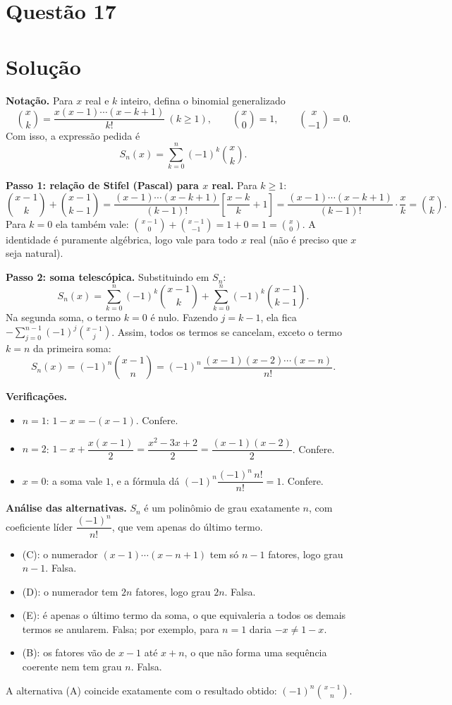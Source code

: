 \documentclass{article}%
\begin{document}
\section*{Questão 17}

\section*{Solução}

\textbf{Notação.} Para $x$ real e $k$ inteiro, defina o binomial generalizado
\[
\binom{x}{k}=\frac{x(x-1)\cdots(x-k+1)}{k!}\ (k\ge 1),\qquad \binom{x}{0}=1,\qquad \binom{x}{-1}=0 .
\]
Com isso, a expressão pedida é
\[
S_n(x)=\sum_{k=0}^{n}(-1)^k\binom{x}{k}.
\]

\textbf{Passo 1: relação de Stifel (Pascal) para $x$ real.} Para $k\ge 1$:
\[
\binom{x-1}{k}+\binom{x-1}{k-1}
=\frac{(x-1)\cdots(x-k+1)}{(k-1)!}\left[\frac{x-k}{k}+1\right]
=\frac{(x-1)\cdots(x-k+1)}{(k-1)!}\cdot\frac{x}{k}
=\binom{x}{k}.
\]
Para $k=0$ ela também vale: $\binom{x-1}{0}+\binom{x-1}{-1}=1+0=1=\binom{x}{0}$. A identidade é puramente algébrica, logo vale para todo $x$ real (não é preciso que $x$ seja natural).

\textbf{Passo 2: soma telescópica.} Substituindo em $S_n$:
\[
S_n(x)=\sum_{k=0}^{n}(-1)^k\binom{x-1}{k}+\sum_{k=0}^{n}(-1)^k\binom{x-1}{k-1}.
\]
Na segunda soma, o termo $k=0$ é nulo. Fazendo $j=k-1$, ela fica $-\sum_{j=0}^{n-1}(-1)^j\binom{x-1}{j}$. Assim, todos os termos se cancelam, exceto o termo $k=n$ da primeira soma:
\[
S_n(x)=(-1)^n\binom{x-1}{n}=(-1)^n\,\frac{(x-1)(x-2)\cdots(x-n)}{n!}.
\]

\textbf{Verificações.}
\begin{itemize}
\item $n=1$: $1-x=-(x-1)$. Confere.
\item $n=2$: $1-x+\dfrac{x(x-1)}{2}=\dfrac{x^2-3x+2}{2}=\dfrac{(x-1)(x-2)}{2}$. Confere.
\item $x=0$: a soma vale $1$, e a fórmula dá $(-1)^n\dfrac{(-1)^n\,n!}{n!}=1$. Confere.
\end{itemize}

\textbf{Análise das alternativas.} $S_n$ é um polinômio de grau exatamente $n$, com coeficiente líder $\dfrac{(-1)^n}{n!}$, que vem apenas do último termo.
\begin{itemize}
\item (C): o numerador $(x-1)\cdots(x-n+1)$ tem só $n-1$ fatores, logo grau $n-1$. Falsa.
\item (D): o numerador tem $2n$ fatores, logo grau $2n$. Falsa.
\item (E): é apenas o último termo da soma, o que equivaleria a todos os demais termos se anularem. Falsa; por exemplo, para $n=1$ daria $-x\neq 1-x$.
\item (B): os fatores vão de $x-1$ até $x+n$, o que não forma uma sequência coerente nem tem grau $n$. Falsa.
\end{itemize}
A alternativa (A) coincide exatamente com o resultado obtido: $(-1)^n\binom{x-1}{n}$.
\end{document}
